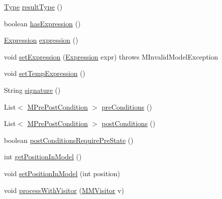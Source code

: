 \begin{DoxyCompactItemize}
\item 
\hyperlink{interfaceorg_1_1tzi_1_1use_1_1uml_1_1ocl_1_1type_1_1_type}{Type} \hyperlink{classorg_1_1tzi_1_1use_1_1uml_1_1mm_1_1_m_operation_a05101d3e2ad7b78e470772c7822af12d}{result\-Type} ()
\item 
boolean \hyperlink{classorg_1_1tzi_1_1use_1_1uml_1_1mm_1_1_m_operation_aa8f5542fbbd5be55f28cc3a61993e99c}{has\-Expression} ()
\item 
\hyperlink{classorg_1_1tzi_1_1use_1_1uml_1_1ocl_1_1expr_1_1_expression}{Expression} \hyperlink{classorg_1_1tzi_1_1use_1_1uml_1_1mm_1_1_m_operation_a2b96916b8d1fed0a88095868e0e5357a}{expression} ()
\item 
void \hyperlink{classorg_1_1tzi_1_1use_1_1uml_1_1mm_1_1_m_operation_ae4e266e7850b2d50cd3f228a44781e98}{set\-Expression} (\hyperlink{classorg_1_1tzi_1_1use_1_1uml_1_1ocl_1_1expr_1_1_expression}{Expression} expr)  throws M\-Invalid\-Model\-Exception 
\item 
void \hyperlink{classorg_1_1tzi_1_1use_1_1uml_1_1mm_1_1_m_operation_a3179f525469e0de5e2361e824fdbc79d}{set\-Temp\-Expression} ()
\item 
String \hyperlink{classorg_1_1tzi_1_1use_1_1uml_1_1mm_1_1_m_operation_a001e3cd28b2d95ce118f929e07da5694}{signature} ()
\item 
List$<$ \hyperlink{classorg_1_1tzi_1_1use_1_1uml_1_1mm_1_1_m_pre_post_condition}{M\-Pre\-Post\-Condition} $>$ \hyperlink{classorg_1_1tzi_1_1use_1_1uml_1_1mm_1_1_m_operation_a940ec63c56cab1355361d75807f8db15}{pre\-Conditions} ()
\item 
List$<$ \hyperlink{classorg_1_1tzi_1_1use_1_1uml_1_1mm_1_1_m_pre_post_condition}{M\-Pre\-Post\-Condition} $>$ \hyperlink{classorg_1_1tzi_1_1use_1_1uml_1_1mm_1_1_m_operation_aa8798ad483537a714296bcc64af68e99}{post\-Conditions} ()
\item 
boolean \hyperlink{classorg_1_1tzi_1_1use_1_1uml_1_1mm_1_1_m_operation_a6449279b8c5cb99d750525181f733f28}{post\-Conditions\-Require\-Pre\-State} ()
\item 
int \hyperlink{classorg_1_1tzi_1_1use_1_1uml_1_1mm_1_1_m_operation_ae08144345dfcb3a58ab562218c8c1b44}{get\-Position\-In\-Model} ()
\item 
void \hyperlink{classorg_1_1tzi_1_1use_1_1uml_1_1mm_1_1_m_operation_a305cfc5618101518f53c40a79e3f8e8e}{set\-Position\-In\-Model} (int position)
\item 
void \hyperlink{classorg_1_1tzi_1_1use_1_1uml_1_1mm_1_1_m_operation_a2ffb06d3c523e81a9561343d6d149ee9}{process\-With\-Visitor} (\hyperlink{interfaceorg_1_1tzi_1_1use_1_1uml_1_1mm_1_1_m_m_visitor}{M\-M\-Visitor} v)

\end{DoxyCompactItemize}
